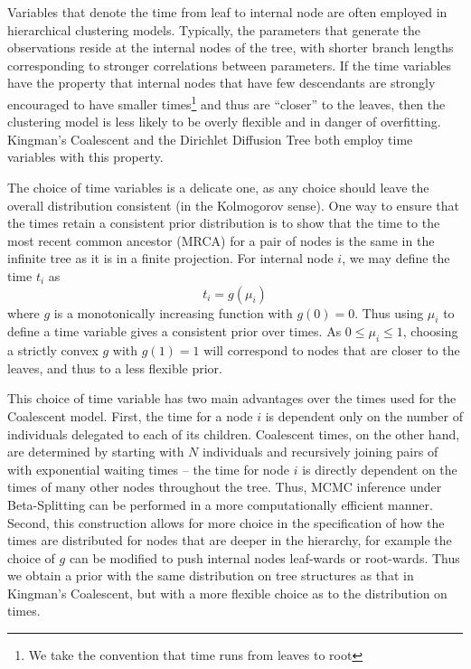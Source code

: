 \documentclass{bioinfo}
\begin{document}
\begin{methods}
\begin{figure}
\label{fig:aldous_betasplit}
\end{figure}

\label{sec:time}
Variables that denote the time from leaf to internal node are often employed in hierarchical clustering models.  Typically, the parameters that generate the observations reside at the internal nodes of the tree, with shorter branch lengths corresponding to stronger correlations between parameters.  If the time variables have the property that internal nodes that have few descendants are strongly encouraged to have smaller times\footnote{We take the convention that time runs from leaves to root} and thus are ``closer'' to the leaves, then the clustering model is less likely to be overly flexible and in danger of overfitting.  Kingman's Coalescent and the Dirichlet Diffusion Tree \cite{neal2003dft} both employ time variables with this property.

The choice of time variables is a delicate one, as any choice should leave the overall distribution consistent (in the Kolmogorov sense).  One way to ensure that the times retain a consistent prior distribution is to show that the time to the most recent common ancestor (MRCA) for a pair of nodes is the same in the infinite tree as it is in a finite projection.  For internal node $i$, we may define the time $t_i$ as
\begin{equation}
t_i = g(\mu_i) \label{eq:t_p}
\end{equation}
where $g$ is a monotonically increasing function with $g(0)=0$.  Thus using $\mu_i$ to define a time variable gives a consistent prior over times.  As $0 \leq \mu_i \leq 1$, choosing a strictly convex $g$ with $g(1)=1$ will correspond to nodes that are closer to the leaves, and thus to a less flexible prior. 

This choice of time variable has two main advantages over the times used for the Coalescent model.  First, the time for a node $i$ is dependent only on the number of individuals delegated to each of its children.  Coalescent times, on the other hand, are determined by starting with $N$ individuals and recursively joining pairs of with exponential waiting times -- the time for node $i$ is directly dependent on the times of many other nodes throughout the tree.  Thus, MCMC inference under Beta-Splitting can be performed in a more computationally efficient manner.  Second, this construction allows for more choice in the specification of how the times are distributed for nodes that are deeper in the hierarchy, for example the choice of $g$ can be modified to push internal nodes leaf-wards or root-wards.  Thus we obtain a prior with the same distribution on tree structures as that in Kingman's Coalescent, but with a more flexible choice as to the distribution on times.


\end{methods}
\end{document}
